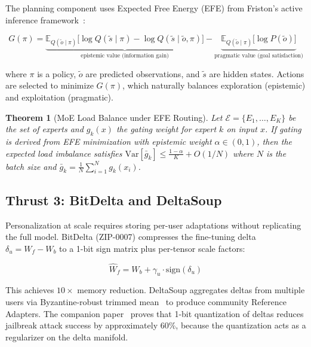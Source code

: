 \documentclass[11pt,letterpaper]{article}
\newtheorem{theorem}{Theorem}[section]
\begin{document}
The planning component uses Expected Free Energy (EFE) from Friston's active inference framework~\cite{friston2017active}:

\begin{equation}
G(\pi) = \underbrace{\mathbb{E}_{Q(\tilde{o} \mid \pi)} \bigl[ \log Q(\tilde{s} \mid \pi) - \log Q(\tilde{s} \mid \tilde{o}, \pi) \bigr]}_{\text{epistemic value (information gain)}} - \underbrace{\mathbb{E}_{Q(\tilde{o} \mid \pi)} \bigl[ \log P(\tilde{o}) \bigr]}_{\text{pragmatic value (goal satisfaction)}}
\label{eq:efe}
\end{equation}

where $\pi$ is a policy, $\tilde{o}$ are predicted observations, and $\tilde{s}$ are hidden states. Actions are selected to minimize $G(\pi)$, which naturally balances exploration (epistemic) and exploitation (pragmatic).

\begin{theorem}[MoE Load Balance under EFE Routing]
Let $\mathcal{E} = \{E_1, \ldots, E_K\}$ be the set of experts and $g_k(x)$ the gating weight for expert $k$ on input $x$. If gating is derived from EFE minimization with epistemic weight $\alpha \in (0, 1)$, then the expected load imbalance satisfies
$\text{Var}[\bar{g}_k] \leq \frac{1-\alpha}{K} + O(1/N)$
where $N$ is the batch size and $\bar{g}_k = \frac{1}{N} \sum_{i=1}^N g_k(x_i)$.
\end{theorem}

\subsection{Thrust 3: BitDelta and DeltaSoup}

Personalization at scale requires storing per-user adaptations without replicating the full model. BitDelta (ZIP-0007) compresses the fine-tuning delta $\delta_u = W_f - W_b$ to a 1-bit sign matrix plus per-tensor scale factors:

\begin{equation}
\hat{W}_f = W_b + \gamma_u \cdot \text{sign}(\delta_u)
\label{eq:bitdelta}
\end{equation}

This achieves $10\times$ memory reduction. DeltaSoup aggregates deltas from multiple users via Byzantine-robust trimmed mean~\cite{blanchard2017machine} to produce community Reference Adapters. The companion paper~\cite{zoo_bitdelta} proves that 1-bit quantization of deltas reduces jailbreak attack success by approximately 60\%, because the quantization acts as a regularizer on the delta manifold.
\end{document}
